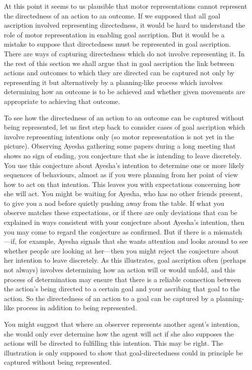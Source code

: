\documentclass[12pt,\papersize]{extarticle}
\begin{document}
At this point it seems to us plausible that motor representations cannot represent the directedness of an action to an outcome. If we supposed that all goal ascription involved representing directedness, it would be hard to understand the role of motor representation in enabling goal ascription.  But it would be a mistake to suppose that directedness must be represented in goal ascription.  There are ways of capturing directedness which do not involve representing it.  In the rest of this section we shall argue that in goal ascription the link between actions and outcomes to which they are directed can be captured not only by representing it but alternatively by a planning-like process which involves determining how an outcome is to be achieved and whether given movements are appropriate to achieving that outcome.  

To see how the directedness of an action to an outcome can be captured without being represented, let us first step back to consider cases of goal ascription which involve representing intentions only (so motor representation is not yet in the picture).  Observing Ayesha gathering some papers during a long meeting that shows no sign of ending, you conjecture that she is intending to leave discretely. You use this conjecture about Ayesha's intention to determine one or more likely sequences of behaviours, almost as if you were planning from her point of view how to act on that intention. This leaves you with expectations concerning how she will act. You might be waiting for Ayesha, who has no other friends present, to give you a nod before quietly pushing away from the table. If what you observe matches these expectations, or if there are only deviations that can be explained in ways consistent with your conjecture about Ayesha's intention, then you may come to regard the conjecture as confirmed.  But if there is a mismatch---if, for example, Ayesha signals that she wants attention and looks around to see whether people are looking at her---then you might reject the conjecture about her intention to leave discretely. As this illustrates, goal ascription often (perhaps not always) involves determining how an action will or would unfold, and this process of determination may ensure that there is a reliable connection between the action's being directed to a certain goal and your ascribing that goal to the action.  So the directedness of an action to a goal can be captured by a planning-like process in addition to being represented.

You might suggest that where an observer represents another agent's intention, she would only ever determine how the agent will act if she also supposes the actions will be directed to fulfilling this intention.  This may be right.  The illustration is only supposed to show that goal-directedness could in principle be captured without being represented.
\end{document}
